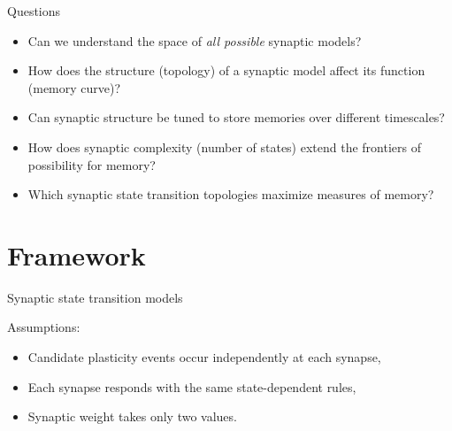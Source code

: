 \documentclass[final,hyperref={pdfpagelabels=false,bookmarks=false}]{beamer}
\newcommand{\pot}{^\text{pot}}
\newcommand{\dep}{^\text{dep}}
\newcommand{\frg}{^\text{forget}}
\newcommand{\eq}{\mathbf{p}^\infty}
\newcommand{\M}{\mathbf{M}}
\begin{document}
\begin{frame}{}
\begin{columns}[t]
\begin{column}{0.33\linewidth}
\begin{block}{Questions}
%
 \begin{itemize}
   \item Can we understand the space of \emph{all possible} synaptic models?
   \item How does the structure (topology) of a synaptic model affect its function (memory curve)?
   \item Can synaptic structure be tuned to store memories over different timescales?
   \item How does synaptic complexity (number of states) extend the frontiers of possibility for memory?
   \item Which synaptic state transition topologies maximize measures of memory?
 \end{itemize}
%
\end{block}


\section{Framework}


\begin{block}{Synaptic state transition models}
%
%
%
\parbox[c]{0.4\linewidth}{
}%
%
%
%
\parbox[c]{0.59\linewidth}{Assumptions:
\begin{itemize}
  \item Candidate plasticity events occur independently at each synapse,
  \item Each synapse responds with the same state-dependent rules,
  \item Synaptic weight takes only two values.
 \end{itemize}
 }


\end{block}
\end{column}
\end{columns}
\end{frame}
\end{document}
